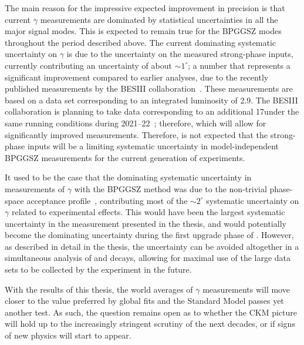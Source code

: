 The main reason for the impressive expected improvement in precision is that current $\gamma$ measurements are dominated by statistical uncertainties in all the major signal modes. This is expected to remain true for the BPGGSZ modes throughout the period described above. The current dominating systematic uncertainty on $\gamma$ is due to the uncertainty on the measured strong-phase inputs, currently contributing an uncertainty of about $\sim1^\circ$; a number that represents a significant improvement compared to earlier analyses, due to the recently published measurements by the BESIII collaboration~\cite{BESCISI,BESCISIKSKK}. These measurements are based on a data set corresponding to an integrated luminosity of 2.9\invfb. The BESIII collaboration is planning to take data corresponding to an additional 17\invfb under the same running conditions during 2021--22~\cite{BESTimescale}; therefore, which will allow for significantly improved measurements. Therefore, is not expected that the strong-phase inputs will be a limiting systematic uncertainty in model-independent BPGGSZ measurements for the current generation of experiments. 

It used to be the case that the dominating systematic uncertainty in \lhcb measurements of $\gamma$ with the BPGGSZ method was due to the non-trivial phase-space acceptance profile~\cite{LHCb-PAPER-2018-017}, contributing most of the $\sim2^\circ$ systematic uncertainty on $\gamma$ related to experimental effects. This would have been the largest systematic uncertainty in the measurement presented in the thesis, and would potentially become the dominating uncertainty during the first upgrade phase of \lhcb. However, as described in detail in the thesis, the uncertainty can be avoided altogether in a simultaneous analysis of \BtoDK and \BtoDpi decays, allowing for maximal use of the large data sets to be collected by the \lhcb experiment in the future.

With the results of this thesis, the world averages of $\gamma$ measurements will move closer to the value preferred by global fits and the Standard Model passes yet another test. As such, the question remains open as to whether the CKM picture will hold up to the increasingly stringent scrutiny of the next decades, or if signs of new physics will start to appear.





